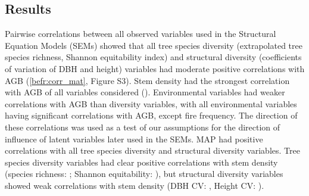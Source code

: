 \begin{refsection}
\section{Results}
\label{befr:sec:results}

Pairwise correlations between all observed variables used in the Structural Equation Models (SEMs) showed that all tree species diversity (extrapolated tree species richness, Shannon equitability index) and structural diversity (coefficients of variation of DBH and height) variables had moderate positive correlations with AGB (\autoref{befr:corr_mat}, Figure S3). Stem density had the strongest correlation with AGB of all variables considered (\ccib{}). Environmental variables had weaker correlations with AGB than diversity variables, with all environmental variables having significant correlations with AGB, except fire frequency. The direction of these correlations was used as a test of our assumptions for the direction of influence of latent variables later used in the SEMs. MAP had positive correlations with all tree species diversity and structural diversity variables. Tree species diversity variables had clear positive correlations with stem density (species richness: \ccsi{}; Shannon equitability: \ccei{}), but structural diversity variables showed weak correlations with stem density (DBH CV: \ccdvi{}, Height CV: \cchvi{}).


\end{refsection}
